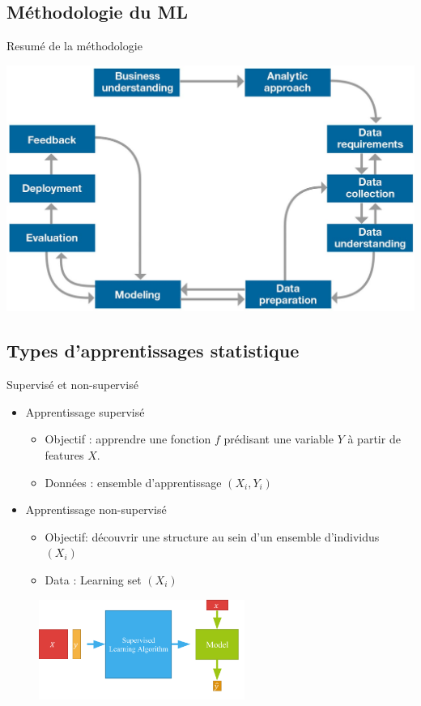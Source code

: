 \documentclass{beamer}
\begin{document}
	\subsection{Méthodologie du ML}
	\begin{frame}{Resumé de la méthodologie}
		\begin{center}
			\includegraphics[scale=0.2]{DataMethod.jpg}
		\end{center}
	\end{frame}






\subsection{Types d'apprentissages statistique}
\begin{frame}{Supervisé et non-supervisé}
\begin{itemize}
	\item Apprentissage supervisé
	\begin{itemize}
		\item Objectif : apprendre une fonction $f$ prédisant une variable $Y$ à partir de
		features $X$.
		\item Données : ensemble d'apprentissage $(X_i, Y_i)$
	\end{itemize}
 \item Apprentissage non-supervisé
 		\begin{itemize}
 			\item  Objectif: découvrir une structure au sein d'un ensemble d'individus $(X_i)$
 			\item Data : Learning set $(X_i)$
 		\end{itemize}
\end{itemize}
	\begin{figure}
	\centering
	\includegraphics[width=0.6\textwidth]{Machine-Learning-3.png}
\end{figure}

\end{frame}
\end{document}
